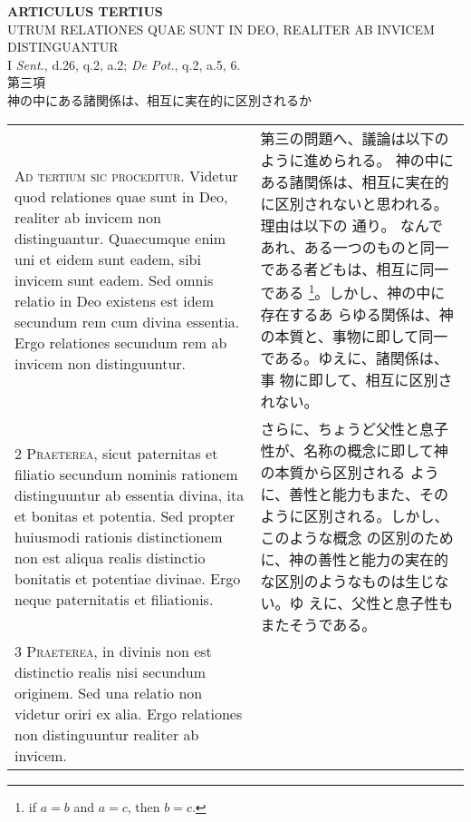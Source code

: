 \documentclass[10pt]{jsarticle} %
\begin{document}
\begin{center}
 {\Large {\bf ARTICULUS TERTIUS}}\\
 {\large UTRUM RELATIONES QUAE SUNT IN DEO, REALITER AB INVICEM DISTINGUANTUR}\\
 {\footnotesize I {\itshape Sent.}, d.26, q.2, a.2; {\itshape De Pot.},
 q.2, a.5, 6.}\\
 {\Large 第三項\\神の中にある諸関係は、相互に実在的に区別されるか}
\end{center}

\begin{longtable}{p{21em}p{21em}}





{\Huge A}{\scshape d tertium sic proceditur}. Videtur quod relationes quae sunt in Deo,
realiter ab invicem non distinguantur. Quaecumque enim uni et eidem sunt
eadem, sibi invicem sunt eadem. Sed omnis relatio in Deo existens est
idem secundum rem cum divina essentia. Ergo relationes secundum rem ab
invicem non distinguuntur.


&


第三の問題へ、議論は以下のように進められる。
神の中にある諸関係は、相互に実在的に区別されないと思われる。理由は以下の
 通り。
なんであれ、ある一つのものと同一である者どもは、相互に同一である
 \footnote{if $a=b$ and $a=c$, then $b=c$.}。しかし、神の中に存在するあ
 らゆる関係は、神の本質と、事物に即して同一である。ゆえに、諸関係は、事
 物に即して、相互に区別されない。

\\



2 {\scshape Praeterea}, sicut paternitas et filiatio secundum nominis rationem
distinguuntur ab essentia divina, ita et bonitas et potentia. Sed
propter huiusmodi rationis distinctionem non est aliqua realis
distinctio bonitatis et potentiae divinae. Ergo neque paternitatis et
filiationis.


&

さらに、ちょうど父性と息子性が、名称の概念に即して神の本質から区別される
 ように、善性と能力もまた、そのように区別される。しかし、このような概念
 の区別のために、神の善性と能力の実在的な区別のようなものは生じない。ゆ
 えに、父性と息子性もまたそうである。

\\



3 {\scshape Praeterea}, in divinis non est distinctio realis nisi secundum
originem. Sed una relatio non videtur oriri ex alia. Ergo relationes non
distinguuntur realiter ab invicem.



\end{longtable}
\end{document}
